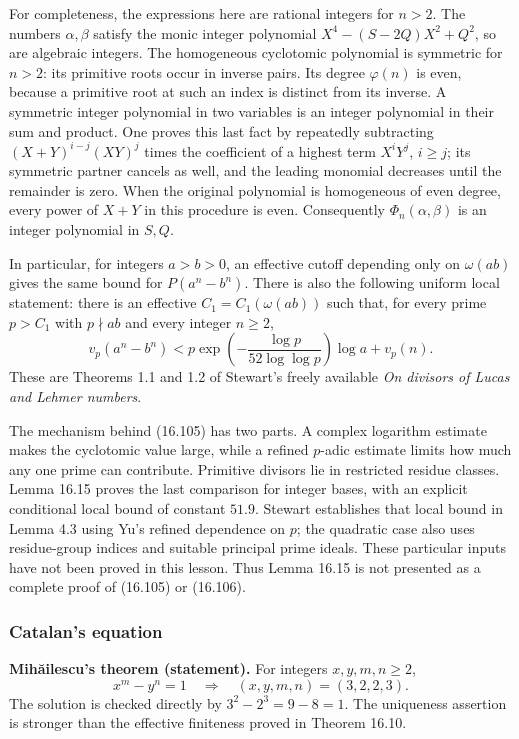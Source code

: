 \documentclass[
  11pt,
  a4paper,
]{article}
\begin{document}
For completeness, the expressions here are rational integers for
\(n>2\). The numbers \(\alpha,\beta\) satisfy the monic integer
polynomial \(X^4-(S-2Q)X^2+Q^2\), so are algebraic integers. The
homogeneous cyclotomic polynomial is symmetric for \(n>2\): its
primitive roots occur in inverse pairs. Its degree \(\varphi(n)\) is
even, because a primitive root at such an index is distinct from its
inverse. A symmetric integer polynomial in two variables is an integer
polynomial in their sum and product. One proves this last fact by
repeatedly subtracting \((X+Y)^{i-j}(XY)^j\) times the coefficient of a
highest term \(X^iY^j\), \(i\ge j\); its symmetric partner cancels as
well, and the leading monomial decreases until the remainder is zero.
When the original polynomial is homogeneous of even degree, every power
of \(X+Y\) in this procedure is even. Consequently
\(\Phi_n(\alpha,\beta)\) is an integer polynomial in \(S,Q\).

In particular, for integers \(a>b>0\), an effective cutoff depending
only on \(\omega(ab)\) gives the same bound for \(P(a^n-b^n)\). There is
also the following uniform local statement: there is an effective
\(C_1=C_1(\omega(ab))\) such that, for every prime \(p>C_1\) with
\(p\nmid ab\) and every integer \(n\ge2\), \[
 v_p(a^n-b^n)<
 p\exp\!\left(-\frac{\log p}{52\log\log p}\right)\log a+v_p(n).
 \tag{16.106}
\] These are Theorems 1.1 and 1.2 of Stewart's freely available \emph{On
divisors of Lucas and Lehmer numbers}.

The mechanism behind (16.105) has two parts. A complex logarithm
estimate makes the cyclotomic value large, while a refined \(p\)-adic
estimate limits how much any one prime can contribute. Primitive
divisors lie in restricted residue classes. Lemma 16.15 proves the last
comparison for integer bases, with an explicit conditional local bound
of constant \(51.9\). Stewart establishes that local bound in Lemma 4.3
using Yu's refined dependence on \(p\); the quadratic case also uses
residue-group indices and suitable principal prime ideals. These
particular inputs have not been proved in this lesson. Thus Lemma 16.15
is not presented as a complete proof of (16.105) or (16.106).

\subsubsection{Catalan's equation}\label{catalans-equation}

\textbf{Mihăilescu's theorem (statement).} For integers \(x,y,m,n\ge2\),
\[
 x^m-y^n=1
 \quad\Longrightarrow\quad
 (x,y,m,n)=(3,2,2,3).
 \tag{16.107}
\] The solution is checked directly by \(3^2-2^3=9-8=1\). The uniqueness
assertion is stronger than the effective finiteness proved in Theorem
16.10.
\end{document}
